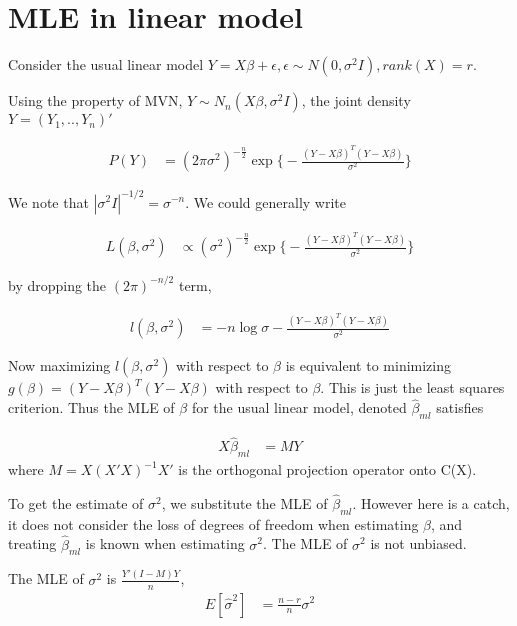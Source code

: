 
 \section{MLE in linear model}
 
Consider the usual linear model $Y = X\beta + \epsilon, \epsilon \sim N(0, \sigma^2 I), rank(X) = r$. 

Using the property of MVN, $Y \sim N_n (X \beta, \sigma^2 I) $, the joint density $Y = (Y_1, .., Y_n)'$

\begin{align*}
P(Y) &= (2\pi \sigma^2)^{-\frac{n}{2}} \exp \Big \{ - \frac{(Y- X\beta)^T(Y- X\beta)}{\sigma^2} \Big \}
\end{align*}

We note that $| \sigma^2 I |^{-1/2} = \sigma^{-n}$. We could generally write

\begin{align*}
L(\beta, \sigma^2) & \propto (\sigma^2)^{-\frac{n}{2}} \exp \Big \{ - \frac{(Y- X\beta)^T(Y- X\beta)}{\sigma^2} \Big \}
\end{align*}

 by dropping the $(2\pi)^{-n/2}$ term, 
 
 \begin{align*}
l(\beta, \sigma^2) & =-n \log \sigma - \frac{(Y- X\beta)^T(Y- X\beta)}{\sigma^2}
\end{align*}

Now maximizing $l(\beta, \sigma^2) $ with respect to $\beta$ is equivalent to minimizing $g(\beta) = (Y- X\beta)^T(Y- X\beta)$ with respect to $\beta$. This is just the least squares criterion. 
Thus the MLE of $\beta$ for the usual linear model, denoted $\hat{\beta}_{ml}$ satisfies

 \begin{align*}
X \hat{\beta}_{ml} & = M Y
\end{align*}
where $M= X(X'X)^{-1}X'$ is the orthogonal projection operator onto C(X). 

To get the estimate of $\sigma^2$, we substitute the MLE of $\hat{\beta}_{ml}$. However here is a catch, it does not consider the loss of degrees of freedom when estimating $\beta$, and treating $\hat{\beta}_{ml}$ is known when estimating $\sigma^2$. The MLE of $\sigma^2$ is not unbiased. 

The MLE of $\sigma^2$ is $\frac{Y' (I-M)Y}{n}$, 
 \begin{align*}
E [\hat{\sigma}^2] & = \frac{n-r}{n} \sigma^2
\end{align*}
